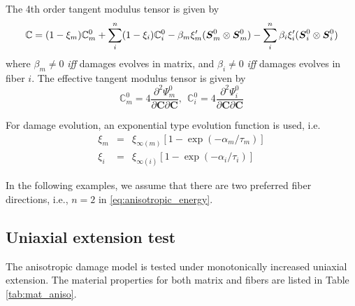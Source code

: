 \documentclass[12pt]{article}
\newcommand{\tensor}[1]{\ensuremath{\boldsymbol{#1}}}
\numberwithin{equation}{section}
\begin{document}
The 4th order tangent modulus tensor is given by
\begin{equation}\label{eq:aniso_tangent}
  \mathbb{C} = 
  (1-\xi_m)\mathbb{C}_m^0 + \sum_i^n (1-\xi_i) \mathbb{C}_i^0 - \beta_m \xi_m' (\tensor S_m^0 \otimes \tensor S_m^0 ) - \sum_i^n \beta_i \xi_i' (\tensor S_i^0 \otimes \tensor S_i^0 )\\
\end{equation}
where $\beta_m\neq 0$ {\it iff} damages evolves in matrix, and
$\beta_i \neq 0$ {\it iff} damages evolves in fiber $i$. The effective
tangent modulus tensor is given by
\begin{equation}\label{eq:aniso_tangent0}
  \mathbb{C}_m^0 = 4\frac{\partial ^2 \Psi_m^0}{\partial\tensor C \partial\tensor C}, ~~ \mathbb{C}_i^0 =  4 \frac{\partial ^2 \Psi_i^0}{\partial\tensor C \partial\tensor C}
\end{equation}

For damage evolution, an exponential type evolution function is used,
i.e.
\begin{eqnarray}
  \xi_m &= &\xi_{\infty (m)}[1-\exp(-\alpha_m/\tau_m)]\\
  \xi_i &=& \xi_{\infty (i)}[1-\exp(-\alpha_i/\tau_i)]
\end{eqnarray}

In the following examples, we assume that there are two preferred
fiber directions, i.e., $n=2$ in \eqref{eq:anisotropic_energy}.

\subsection{Uniaxial extension test}
The anisotropic damage model is tested under monotonically increased
uniaxial extension. The material properties for both matrix and fibers
are listed in Table \ref{tab:mat_aniso}.
\end{document}
